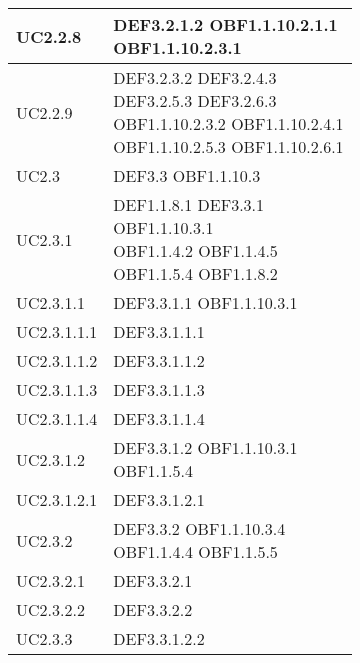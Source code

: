 \documentclass{scalatekids-article}
\begin{document}
\begin{longtable}[H]{|p{5.5cm}|p{5.5cm}|}
  \hline
  UC2.2.8 & \multiLineCell[t]{DEF3.2.1.2 OBF1.1.10.2.1.1\\OBF1.1.10.2.3.1}\\
  \hline
  UC2.2.9 & \multiLineCell[t]{DEF3.2.3.2 DEF3.2.4.3\\DEF3.2.5.3 DEF3.2.6.3\\OBF1.1.10.2.3.2 OBF1.1.10.2.4.1\\OBF1.1.10.2.5.3 OBF1.1.10.2.6.1\\}\\
  \hline
  UC2.3 & \multiLineCell[t]{DEF3.3 OBF1.1.10.3\\}\\
  \hline
  UC2.3.1 & \multiLineCell[t]{DEF1.1.8.1 DEF3.3.1\\OBF1.1.10.3.1\\OBF1.1.4.2 OBF1.1.4.5\\OBF1.1.5.4 OBF1.1.8.2\\}\\
  \hline
  UC2.3.1.1 & \multiLineCell[t]{DEF3.3.1.1 OBF1.1.10.3.1\\}\\
  \hline
  UC2.3.1.1.1 & \multiLineCell[t]{DEF3.3.1.1.1\\}\\
  \hline
  UC2.3.1.1.2 & \multiLineCell[t]{DEF3.3.1.1.2\\}\\
  \hline
  UC2.3.1.1.3 & \multiLineCell[t]{DEF3.3.1.1.3\\}\\
  \hline
  UC2.3.1.1.4 & \multiLineCell[t]{DEF3.3.1.1.4\\}\\
  \hline
  UC2.3.1.2 & \multiLineCell[t]{DEF3.3.1.2 OBF1.1.10.3.1\\OBF1.1.5.4}\\
  \hline
  UC2.3.1.2.1 & \multiLineCell[t]{DEF3.3.1.2.1\\}\\
  \hline
  UC2.3.2 & \multiLineCell[t]{DEF3.3.2 OBF1.1.10.3.4\\OBF1.1.4.4 OBF1.1.5.5\\}\\
  \hline
  UC2.3.2.1 & \multiLineCell[t]{DEF3.3.2.1\\}\\
  \hline
  UC2.3.2.2 & \multiLineCell[t]{DEF3.3.2.2\\}\\
  \hline
  UC2.3.3 & \multiLineCell[t]{DEF3.3.1.2.2\\}\\

\end{longtable}
\end{document}
